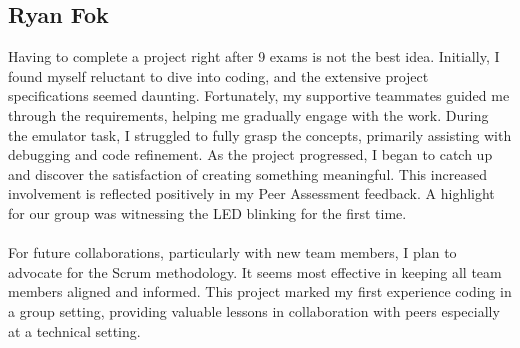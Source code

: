 \documentclass[10pt]{article}
\begin{document}
\subsection{Ryan Fok}
Having to complete a project right after 9 exams is not the best idea. Initially, I found myself reluctant to dive into coding, and the extensive project specifications seemed daunting. Fortunately, my supportive teammates guided me through the requirements, helping me gradually engage with the work. During the emulator task, I struggled to fully grasp the concepts, primarily assisting with debugging and code refinement. As the project progressed, I began to catch up and discover the satisfaction of creating something meaningful. This increased involvement is reflected positively in my Peer Assessment feedback. A highlight for our group was witnessing the LED blinking for the first time. \\
\\
For future collaborations, particularly with new team members, I plan to advocate for the Scrum methodology. It seems most effective in keeping all team members aligned and informed. This project marked my first experience coding in a group setting, providing valuable lessons in collaboration with peers especially at a technical setting.
\end{document}

